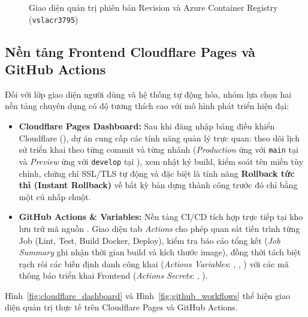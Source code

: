 \begin{figure}[H]
\centering
{}
\caption{Giao diện quản trị phiên bản Revision và Azure Container Registry (\texttt{vslacr3795})}
\label{fig:azure_portal_acr}
\end{figure}

\subsection{Nền tảng Frontend Cloudflare Pages và GitHub Actions}
\label{subsec:nen_tang_cloudflare_github}

Đối với lớp giao diện người dùng và hệ thống tự động hóa, nhóm lựa chọn hai nền tảng chuyên dụng có độ tương thích cao với mô hình phát triển hiện đại:
\begin{itemize}
    \item \textbf{Cloudflare Pages Dashboard:} Sau khi đăng nhập bảng điều khiển Cloudflare (), dự án  cung cấp các tính năng quản lý trực quan: theo dõi lịch sử triển khai theo từng commit và từng nhánh (\textit{Production} ứng với \texttt{main} tại  và \textit{Preview} ứng với \texttt{develop} tại ), xem nhật ký build, kiểm soát tên miền tùy chỉnh, chứng chỉ SSL/TLS tự động và đặc biệt là tính năng \textbf{Rollback tức thì (Instant Rollback)} về bất kỳ bản dựng thành công trước đó chỉ bằng một cú nhấp chuột.
    \item \textbf{GitHub Actions \& Variables:} Nền tảng CI/CD tích hợp trực tiếp tại kho lưu trữ mã nguồn . Giao diện tab \textit{Actions} cho phép quan sát tiến trình từng Job (Lint, Test, Build Docker, Deploy), kiểm tra báo cáo tổng kết (\textit{Job Summary} ghi nhận thời gian build và kích thước image), đồng thời tách biệt rạch ròi các biến định danh công khai (\textit{Actions Variables}: , , ) với các mã thông báo triển khai Frontend (\textit{Actions Secrets}: , ).
\end{itemize}

Hình~\ref{fig:cloudflare_dashboard} và Hình~\ref{fig:github_workflows} thể hiện giao diện quản trị thực tế trên Cloudflare Pages và GitHub Actions.

